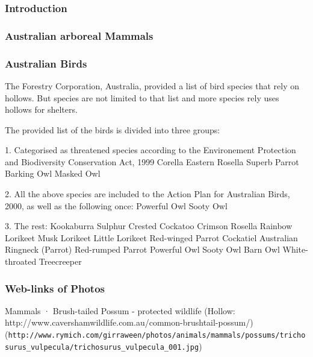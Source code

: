 \documentclass{subfiles}
\begin{document}
	
	\subsubsection{Introduction}
	
	\subsubsection{Australian arboreal Mammals}
	
	\subsubsection{Australian Birds}
	The Forestry Corporation, Australia, provided a list of bird species that rely on hollows. But species are not limited to that list and more species rely uses hollows for shelters.

	The provided list of the birds is divided into three groups:
	
	1. Categorised as threatened species according to the Environement Protection and Biodiversity Conservation Act, 1999 \newline
	Corella
	Eastern Rosella
	Superb Parrot
	Barking Owl
	Masked Owl
	
	
	2. All the above species are included to the Action Plan for Australian Birds, 2000, as well as the following once:\newline
	Powerful Owl
	Sooty Owl
	
	
	3. The rest:\newline
	 Kookaburra
	 Sulphur Crested Cockatoo
	 Crimson Rosella
	 Rainbow Lorikeet 
	 Musk Lorikeet
	 Little Lorikeet 
	 Red-winged Parrot
	 Cockatiel 
	 Australian Ringneck (Parrot) 
	 Red-rumped Parrot 
	 Powerful Owl 
	 Sooty Owl  
	 Barn Owl  
	 White-throated Treecreeper 
	

	
	
	\subsubsection{Web-links of Photos}
	
	Mammals
	·         Brush-tailed Possum - protected wildlife (Hollow: http://www.cavershamwildlife.com.au/common-brushtail-possum/) 
	(\verb|http://www.rymich.com/girraween/photos/animals/mammals/possums/trichosurus_vulpecula/trichosurus_vulpecula_001.jpg|) 
	
	
	
\end{document}
